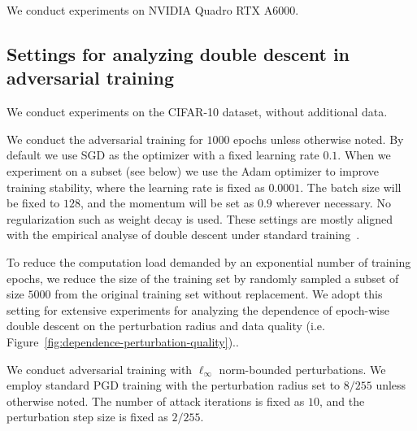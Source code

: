 We conduct experiments on 
NVIDIA Quadro RTX A6000.





\subsection{Settings for analyzing double descent in adversarial training}
\label{sect: exp-double-descent}

We conduct experiments on the CIFAR-10 dataset, without additional data.

We conduct the adversarial training for $1000$ epochs unless otherwise noted.
By default we use SGD as the optimizer with a fixed learning rate $0.1$. When we experiment on a subset (see below) we use the Adam optimizer to improve training stability, where the learning rate is fixed as $0.0001$.
The batch size will be fixed to $128$, and the momentum will be set as $0.9$ wherever necessary. No regularization such as weight decay is used. These settings are mostly aligned with the empirical analyse of double descent under standard training~\citep{Nakkiran2020DeepDD}.

To reduce the computation load demanded by an exponential number of training epochs, we reduce the size of the training set by randomly sampled a subset of size $5000$ from the original training set without replacement. 
We adopt this setting for extensive experiments for analyzing the dependence of epoch-wise double descent on the perturbation radius and data quality (i.e. Figure~\ref{fig:dependence-perturbation-quality})..

We conduct adversarial training with $\ell_\infty$ norm-bounded perturbations. We employ standard PGD training with the perturbation radius set to $8/255$ unless otherwise noted. The number of attack iterations is fixed as $10$, and the perturbation step size is fixed as $2/255$.
 
